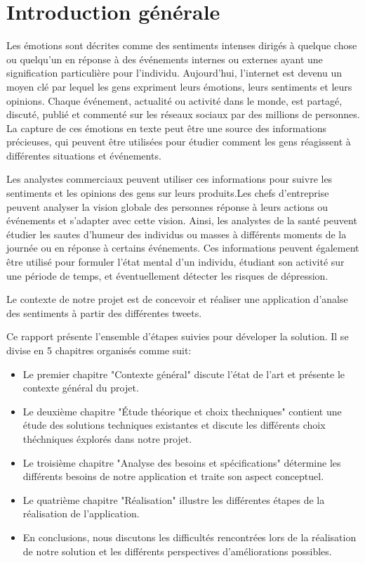 \chapter{Introduction générale}
Les émotions sont décrites comme des sentiments intenses dirigés à quelque chose ou quelqu'un en réponse à des événements internes ou externes ayant une signification particulière pour l'individu. Aujourd'hui, l'internet est devenu un moyen clé par lequel les gens expriment leurs émotions, leurs sentiments et leurs opinions. Chaque événement, actualité ou activité dans le monde, est partagé, discuté, publié et commenté sur les réseaux sociaux par des millions de personnes. La capture de ces émotions en texte peut être une source des informations précieuses, qui peuvent être utilisées pour étudier comment les gens réagissent à différentes situations et événements.

Les analystes commerciaux peuvent utiliser ces informations pour suivre les sentiments et les opinions des gens sur leurs produits.Les chefs d’entreprise peuvent analyser la vision globale des personnes réponse à leurs actions ou événements et s'adapter avec cette vision. Ainsi, les analystes de la santé peuvent étudier les sautes d'humeur des individus ou
masses à différents moments de la journée ou en réponse à certains événements. Ces informations peuvent également être utilisé pour formuler l'état mental d'un individu, étudiant son activité sur une période de temps, et éventuellement détecter les risques de dépression.

Le contexte de notre projet est de concevoir et réaliser une application d'analse des sentiments à partir des différentes tweets.

Ce rapport présente l'ensemble d'étapes suivies pour déveloper la solution. Il se divise en 5 chapitres organisés comme suit:
\begin{itemize}
    \item Le premier chapitre "Contexte général" discute l'état de l'art et présente le contexte général du projet.
    \item Le deuxième chapitre "Étude théorique et choix thechniques" contient une étude des solutions techniques existantes et discute les différents choix théchniques éxplorés dans notre projet.
    \item Le troisième chapitre "Analyse des besoins et spécifications" détermine les différents besoins de notre application et traite son aspect conceptuel.
    \item Le quatrième chapitre "Réalisation" illustre les différentes étapes de la réalisation de l'application.
    \item En conclusions, nous discutons les difficultés rencontrées lors de la réalisation de notre solution et les différents perspectives d'améliorations possibles.
\end{itemize}


